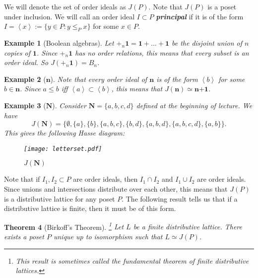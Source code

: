 \documentclass[11pt]{article}
\newtheorem{theorem}{Theorem}
\newtheorem{example}[theorem]{Example}
\newcommand{\It}[1]{\textit{#1}}
\newcommand{\Bf}[1]{\textbf{#1}}
\newcommand{\keyword}[1]{\Bf{\It{#1}}}
\begin{document}
We will denote the set of order ideals as $J(P)$. Note that $J(P)$ is a poset under inclusion. We will call an order ideal $I \subset P$ \keyword{principal} if it is of the form $I=\left\langle x \right\rangle:=\{y \in P: y \leq_P x\}$ for some $x \in P$.

\begin{example}[Boolean algebras]
Let $+_n \Bf{1}=\Bf{1}+ \ldots +\Bf{1}$ be the disjoint union of $n$ copies of $\Bf{1}$. Since $+_n \Bf{1}$ has no order relations, this means that every subset is an order ideal. So $J(+_n \Bf{1})=B_n$.
\end{example}

\begin{example}[$\Bf{n}$]
Note that every order ideal of $\Bf{n}$ is of the form $\left\langle b \right\rangle$ for some $b \in \Bf{n}$. Since $a \leq b$ iff $\left\langle a \right\rangle \subset \left\langle b \right\rangle$, this means that $J(\Bf{n}) \simeq \Bf{n+1}$.
\end{example}

\begin{example}[$\Bf{N}$]
Consider $\Bf{N}=\{a,b,c,d\}$ defined at the beginning of lecture. We have $$J(\Bf{N})=\{\emptyset,\{a\},\{b\},\{a,b,c\},\{b,d\},\{a,b,d\},\{a,b,c,d\},\{a,b\}\}.$$ This gives the following Hasse diagram:
\begin{figure}
  \centering
  \texttt{[image: letterset.pdf]}
  \caption{$J(\Bf{N})$}
\end{figure}
\end{example}

Note that if $I_1,I_2 \subset P$ are order ideals, then $I_1 \cap I_2$ and $I_1 \cup I_2$ are order ideals. Since unions and intersections distribute over each other, this means that $J(P)$ is a distributive lattice for any poset $P$. The following result tells us that if a distributive lattice is finite, then it must be of this form.

\begin{theorem}[Birkoff's Theorem]\footnote{This result is sometimes called the fundamental theorem of finite distributive lattices.} \label{birkoff}
Let $L$ be a finite distributive lattice. There exists a poset $P$ unique up to isomorphism such that $L \simeq J(P)$.
\end{theorem}
\end{document}
